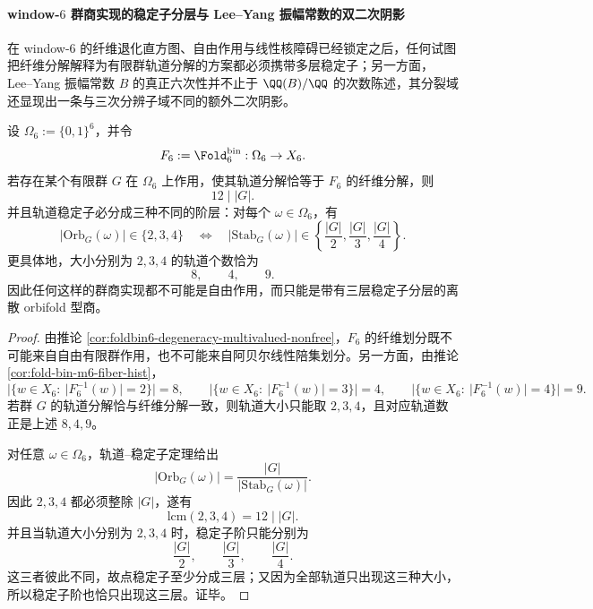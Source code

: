 \paragraph{window-\texorpdfstring{$6$}{6} 群商实现的稳定子分层与 Lee--Yang 振幅常数的双二次阴影}
在 window-\(6\) 的纤维退化直方图、自由作用与线性核障碍已经锁定之后，任何试图把纤维分解解释为有限群轨道分解的方案都必须携带多层稳定子；另一方面，Lee--Yang 振幅常数 \(B\) 的真正六次性并不止于 \(\QQ(B)/\QQ\) 的次数陈述，其分裂域还显现出一条与三次分辨子域不同的额外二次阴影。

\begin{theorem}\label{thm:xi-window6-group-quotient-isotropy-strata}
设 \(\Omega_6:=\{0,1\}^6\)，并令
\[
F_6:=\Fold^{\mathrm{bin}}_6:\Omega_6\to X_6.
\]
若存在某个有限群 \(G\) 在 \(\Omega_6\) 上作用，使其轨道分解恰等于 \(F_6\) 的纤维分解，则
\[
\boxed{\;12\mid |G|.\;}
\]
并且轨道稳定子必分成三种不同的阶层：对每个 \(\omega\in\Omega_6\)，有
\[
|\mathrm{Orb}_G(\omega)|\in\{2,3,4\}
\quad\Longleftrightarrow\quad
|\mathrm{Stab}_G(\omega)|\in\left\{\frac{|G|}{2},\frac{|G|}{3},\frac{|G|}{4}\right\}.
\]
更具体地，大小分别为 \(2,3,4\) 的轨道个数恰为
\[
8,\qquad 4,\qquad 9.
\]
因此任何这样的群商实现都不可能是自由作用，而只能是带有三层稳定子分层的离散 orbifold 型商。
\end{theorem}
\begin{proof}
由推论 \ref{cor:foldbin6-degeneracy-multivalued-nonfree}，\(F_6\) 的纤维划分既不可能来自自由有限群作用，也不可能来自阿贝尔线性陪集划分。另一方面，由推论 \ref{cor:fold-bin-m6-fiber-hist}，
\[
|\{w\in X_6:\ |F_6^{-1}(w)|=2\}|=8,\qquad
|\{w\in X_6:\ |F_6^{-1}(w)|=3\}|=4,\qquad
|\{w\in X_6:\ |F_6^{-1}(w)|=4\}|=9.
\]
若群 \(G\) 的轨道分解恰与纤维分解一致，则轨道大小只能取 \(2,3,4\)，且对应轨道数正是上述 \(8,4,9\)。

对任意 \(\omega\in\Omega_6\)，轨道--稳定子定理给出
\[
|\mathrm{Orb}_G(\omega)|=\frac{|G|}{|\mathrm{Stab}_G(\omega)|}.
\]
因此 \(2,3,4\) 都必须整除 \(|G|\)，遂有
\[
\mathrm{lcm}(2,3,4)=12\mid |G|.
\]
并且当轨道大小分别为 \(2,3,4\) 时，稳定子阶只能分别为
\[
\frac{|G|}{2},\qquad \frac{|G|}{3},\qquad \frac{|G|}{4}.
\]
这三者彼此不同，故点稳定子至少分成三层；又因为全部轨道只出现这三种大小，所以稳定子阶也恰只出现这三层。证毕。
\end{proof}

